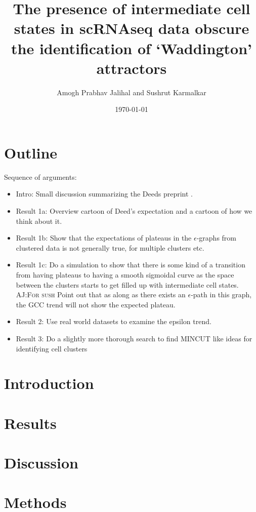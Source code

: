 \documentclass[11pt]{article}
\author{Amogh Prabhav Jalihal and Sushrut Karmalkar}
\date{\today}
\title{\amogh{wip} The presence of intermediate cell states in scRNAseq data obscure the identification of `Waddington' attractors }
\newcommand{\amogh}[1]{{\textsc{\color{blue} AJ:#1}}}
\newcommand{\todo}{{\color{red}{\small TODO\ }}}
\newcommand{\prog}{{\color{orange}{\small PROG\ }}}
\begin{document}
\maketitle
\section*{Outline}
Sequence of arguments:
\begin{itemize}
\item \todo Intro: Small discussion summarizing the Deeds preprint \cite{sparta22}.
\item \todo Result 1a: Overview cartoon of Deed's expectation and a cartoon of how we think about it.
\item \prog Result 1b: Show that the expectations of plateaus in the $\epsilon$-graphs from clustered data is not generally true, for multiple clusters etc.
\item \todo Result 1c: Do a simulation to show that there is some kind of a transition from having plateaus to having a smooth sigmoidal curve as the space between the clusters starts to get filled up with intermediate cell states. \amogh{For sush} Point out that as along as there exists an $\epsilon$-path in this graph, the GCC trend will not show the expected plateau.
\item \todo Result 2: Use real world datasets to examine the epsilon trend.
\item \todo Result 3:  Do a slightly more thorough search to find \textsc{MINCUT} like ideas for identifying cell clusters
\end{itemize}


 
\section*{Introduction}
\label{sec:orgc8a6b0e}
\section*{Results}
\label{sec:org8da0183}
\section*{Discussion}
\label{sec:org4e03e49}

\section*{Methods}
\label{sec:org7a0bf76}


\end{document}
